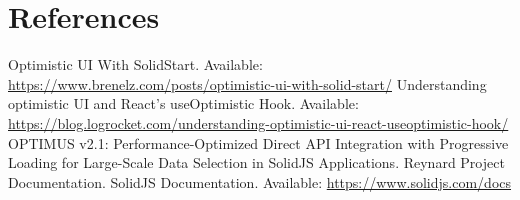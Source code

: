\documentclass[10pt]{article}
\begin{document}
\section{References}
\begin{thebibliography}{99}
 Optimistic UI With SolidStart. Available: \url{https://www.brenelz.com/posts/optimistic-ui-with-solid-start/}
 Understanding optimistic UI and React’s useOptimistic Hook. Available: \url{https://blog.logrocket.com/understanding-optimistic-ui-react-useoptimistic-hook/}
 OPTIMUS v2.1: Performance-Optimized Direct API Integration with Progressive Loading for Large-Scale Data Selection in SolidJS Applications. Reynard Project Documentation.
 SolidJS Documentation. Available: \url{https://www.solidjs.com/docs}
\end{thebibliography}
\end{document}
